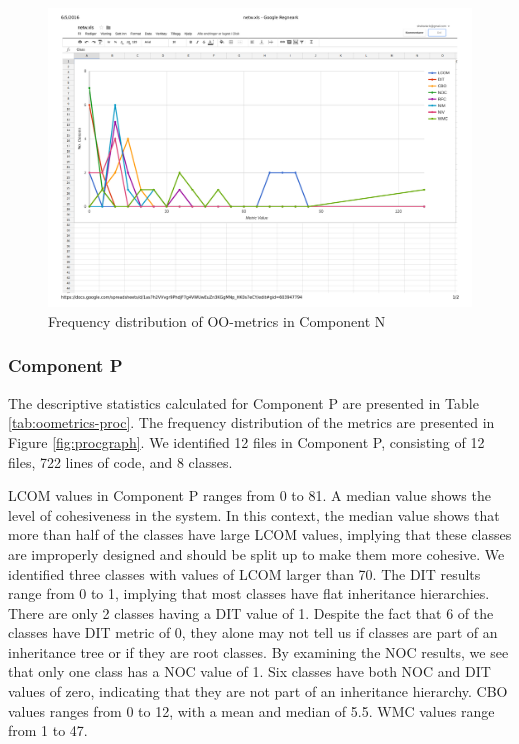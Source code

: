 \begin{landscape}
\setlength\LTleft{-.5in}
	\begin{figure}
	\centering
	\includegraphics[width=\textwidth]{images/pdf/network.pdf}
	\caption{Frequency distribution of OO-metrics in Component N}
	\label{fig:netgraph}
	\end{figure}
\end{landscape}



\subsubsection{Component P}
The descriptive statistics calculated for Component P are presented in Table \ref{tab:oometrics-proc}. The frequency distribution of the metrics are presented in Figure \ref{fig:procgraph}. We identified 12 files in Component P, consisting of 12 files, 722 lines of code, and 8 classes.

LCOM values in Component P ranges from 0 to 81. A median value shows the level of cohesiveness in the system. In this context, the median value shows that more than half of the classes have large LCOM values, implying that these classes are improperly designed and should be split up to make them more cohesive. We identified three classes with values of LCOM larger than 70. The DIT results range from 0 to 1, implying that most classes have flat inheritance hierarchies. There are only 2 classes having a DIT value of 1. Despite the fact that 6 of the classes have DIT metric of 0, they alone may not tell us if classes are part of an inheritance tree or if they are root classes. By examining the NOC results, we see that only one class has a NOC value of 1. Six classes have both NOC and DIT values of zero, indicating that they are not part of an inheritance hierarchy. CBO values ranges from 0 to 12, with a mean and median of 5.5. WMC values range from 1 to 47. 



